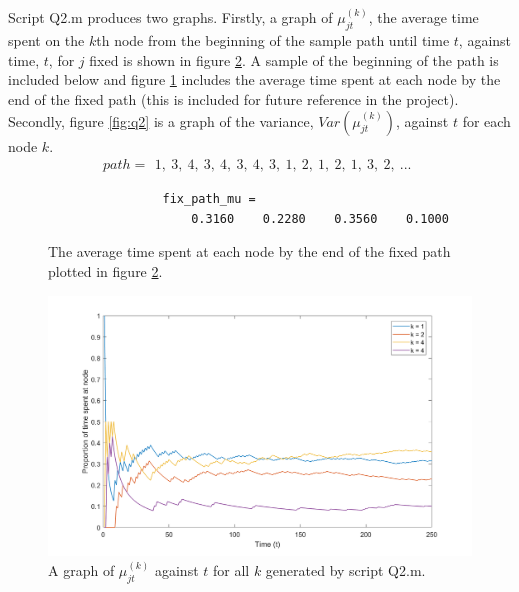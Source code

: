 \documentclass[a4paper]{article}
\begin{document}
Script Q2.m produces two graphs. Firstly, a graph of $\mu_{jt}^{(k)}$, the average time spent on the $k$th node from the beginning of the sample path until time $t$, against time, $t$, for $j$ fixed is shown in figure \ref{fig:q2a}. A sample of the beginning of the path is included below and figure \ref{fig:q2aa} includes the average time spent at each node by the end of the fixed path (this is included for future reference in the project). Secondly, figure \ref{fig:q2} is a graph of the variance, $Var(\mu_{jt}^{(k)})$, against $t$ for each node $k$.
\begin{equation*}
    path = \begin{matrix} 1,\ 3,\ 4,\ 3,\ 4,\ 3,\ 4,\ 3,\ 1,\ 2,\ 1,\ 2,\ 1,\ 3,\ 2,\ ... \end{matrix}
\end{equation*}

\begin{figure}[H]
    \centering
    \begin{verbatim}
                fix_path_mu =
                    0.3160    0.2280    0.3560    0.1000
    \end{verbatim}
    \caption{The average time spent at each node by the end of the fixed path plotted in figure \ref{fig:q2a}.}
    \label{fig:q2aa}
\end{figure}

\begin{figure}[H]
    \centering
    \includegraphics[width=\columnwidth]{q2.png}
    \caption{A graph of $\mu_{jt}^{(k)}$ against $t$ for all $k$ generated by script Q2.m.}
    \label{fig:q2a}
\end{figure}
\end{document}
